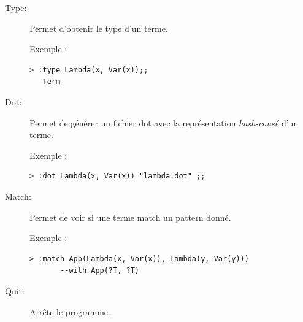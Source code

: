 \documentclass[12pt,a4paper]{article}
\begin{document}
\begin{description}
\item[Type:]
Permet d'obtenir le type d'un terme.\\

\begin{minipage}{\textwidth}
Exemple :
\begin{lstlisting}[basicstyle=\ttfamily\footnotesize]
> :type Lambda(x, Var(x));;
   Term
\end{lstlisting}
\end{minipage}

\item[Dot:]
Permet de générer un fichier dot avec la représentation \textit{hash-consé} d'un terme. \\

\begin{minipage}{\textwidth}
Exemple :
\begin{lstlisting}[basicstyle=\ttfamily\footnotesize]
> :dot Lambda(x, Var(x)) "lambda.dot" ;;
\end{lstlisting}
\end{minipage}

\item[Match:]
Permet de voir si une terme match un pattern donné. \\

\begin{minipage}{\textwidth}
Exemple :
\begin{lstlisting}[basicstyle=\ttfamily\footnotesize]
> :match App(Lambda(x, Var(x)), Lambda(y, Var(y))) 
       --with App(?T, ?T)
\end{lstlisting}
\end{minipage}

\item[Quit:]
Arrête le programme.

\end{description}
\end{document}
